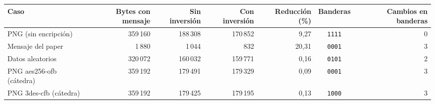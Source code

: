 \begin{tabular}{lrrrrcr}
\toprule
Caso & Bytes con mensaje & Sin inversión & Con inversión & Reducción (\%) & Banderas & Cambios en banderas \\
\midrule
PNG (sin encripción) & 359\,160 & 188\,308 & 170\,852 & 9{,}27 & \texttt{1111} & 0 \\
Mensaje del paper & 1\,880 & 1\,044 & 832 & 20{,}31 & \texttt{0001} & 3 \\
Datos aleatorios & 320\,072 & 160\,032 & 159\,771 & 0{,}16 & \texttt{0101} & 2 \\
PNG aes256-ofb (cátedra) & 359\,192 & 179\,491 & 179\,329 & 0{,}09 & \texttt{0001} & 3 \\
PNG 3des-cfb (cátedra) & 359\,192 & 179\,425 & 179\,195 & 0{,}13 & \texttt{1000} & 3 \\
\bottomrule
\end{tabular}
